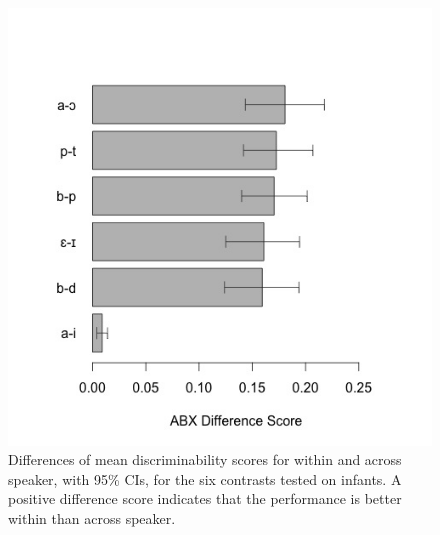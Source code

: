 \documentclass[10pt,letterpaper]{article}
\begin{document}
\vskip -0.1in
\begin{figure}[ht]
\begin{center}
\includegraphics[width=\columnwidth]{AIC_ABX_DifferenceScores_tested_all.jpeg}
\end{center}
\vskip -0.2in
\caption{Differences of mean discriminability scores for within and across speaker, with 95\% CIs, for the six contrasts tested on infants. A positive difference score indicates that the performance is better within than across speaker.} 
\label{fig2}
\end{figure}
\end{document}
